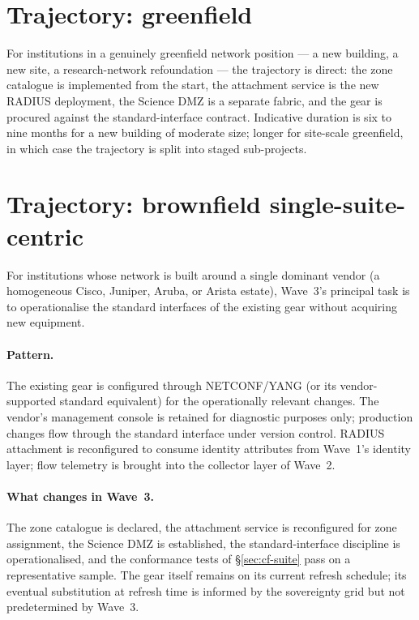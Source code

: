 \section{Trajectory: greenfield}
\label{sec:w3-greenfield}

For institutions in a genuinely greenfield network position --- a
new building, a new site, a research-network refoundation --- the
trajectory is direct: the zone catalogue is implemented from the
start, the attachment service is the new RADIUS deployment, the
Science DMZ is a separate fabric, and the gear is procured against
the standard-interface contract. Indicative duration is six to
nine months for a new building of moderate size; longer for
site-scale greenfield, in which case the trajectory is split
into staged sub-projects.

\section{Trajectory: brownfield single-suite-centric}
\label{sec:w3-brownfield-ms}

For institutions whose network is built around a single dominant
vendor (a homogeneous Cisco, Juniper, Aruba, or Arista estate),
Wave~3's principal task is to operationalise the standard
interfaces of the existing gear without acquiring new equipment.

\paragraph{Pattern.} The existing gear is configured through
NETCONF/YANG (or its vendor-supported standard equivalent) for
the operationally relevant changes. The vendor's management
console is retained for diagnostic purposes only; production
changes flow through the standard interface under version control.
RADIUS attachment is reconfigured to consume identity attributes
from Wave~1's identity layer; flow telemetry is brought into the
collector layer of Wave~2.

\paragraph{What changes in Wave~3.} The zone catalogue is
declared, the attachment service is reconfigured for zone
assignment, the Science DMZ is established, the standard-interface
discipline is operationalised, and the conformance tests of
\S\ref{sec:cf-suite} pass on a representative sample. The gear
itself remains on its current refresh schedule; its eventual
substitution at refresh time is informed by the sovereignty grid
but not predetermined by Wave~3.

